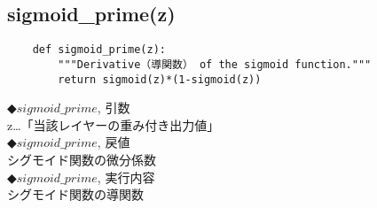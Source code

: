 \documentclass[11pt,a4j,fleqn]{jarticle}
\begin{document}
\subsection{sigmoid\_prime(z)}
\begin{verbatim}
    def sigmoid_prime(z):
        """Derivative（導関数） of the sigmoid function."""
        return sigmoid(z)*(1-sigmoid(z))
\end{verbatim}
◆$sigmoid\_prime$, 引数 \\
z…「当該レイヤーの重み付き出力値」\\
◆$sigmoid\_prime$, 戻値 \\
シグモイド関数の微分係数\\
◆$sigmoid\_prime$, 実行内容 \\
シグモイド関数の導関数
\\
\\
\end{document}
